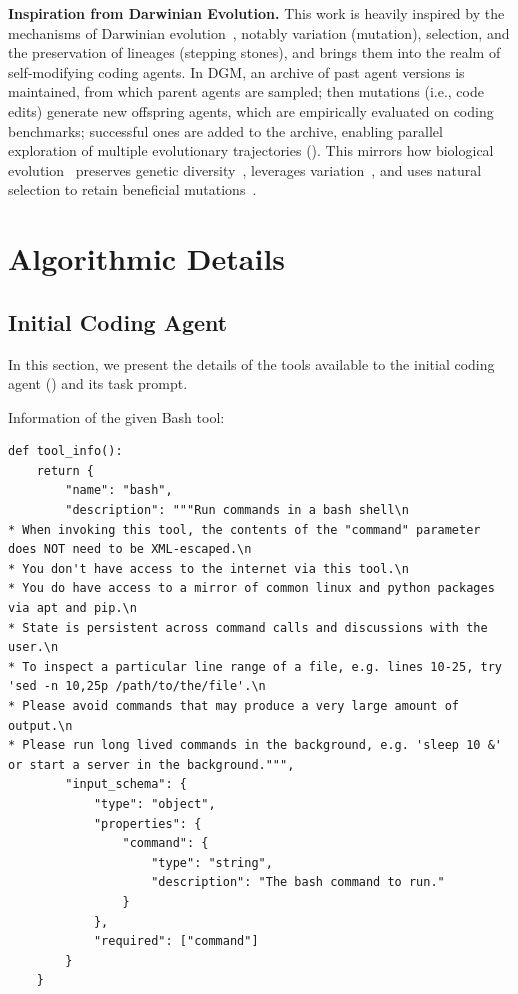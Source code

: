 \documentclass{article} %
\begin{document}
\textbf{Inspiration from Darwinian Evolution.}
This work is heavily inspired by the mechanisms of Darwinian evolution~\citep{darwin2023origin}, notably variation (mutation), selection, and the preservation of lineages (stepping stones), and brings them into the realm of self-modifying coding agents. In DGM, an archive of past agent versions is maintained, from which parent agents are sampled; then mutations (i.e., code edits) generate new offspring agents, which are empirically evaluated on coding benchmarks; successful ones are added to the archive, enabling parallel exploration of multiple evolutionary trajectories (). This mirrors how biological evolution~\citep{edwards2000genetical, wright1932roles} preserves genetic diversity~\citep{mayr1982growth}, leverages variation~\citep{kimura1979neutral}, and uses natural selection to retain beneficial mutations~\citep{dobzhansky1970genetics}.

\section{Algorithmic Details}

\subsection{Initial Coding Agent}
\label{app:initial-agent}

In this section, we present the details of the tools available to the initial coding agent () and its task prompt.

Information of the given Bash tool:

\begin{lstlisting}
def tool_info():
    return {
        "name": "bash",
        "description": """Run commands in a bash shell\n
* When invoking this tool, the contents of the "command" parameter does NOT need to be XML-escaped.\n
* You don't have access to the internet via this tool.\n
* You do have access to a mirror of common linux and python packages via apt and pip.\n
* State is persistent across command calls and discussions with the user.\n
* To inspect a particular line range of a file, e.g. lines 10-25, try 'sed -n 10,25p /path/to/the/file'.\n
* Please avoid commands that may produce a very large amount of output.\n
* Please run long lived commands in the background, e.g. 'sleep 10 &' or start a server in the background.""",
        "input_schema": {
            "type": "object",
            "properties": {
                "command": {
                    "type": "string",
                    "description": "The bash command to run."
                }
            },
            "required": ["command"]
        }
    }
\end{lstlisting}
\end{document}
